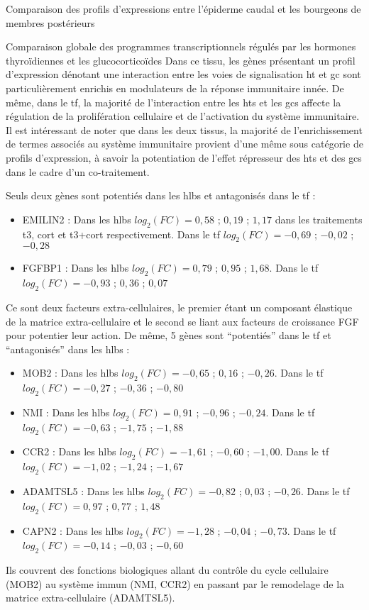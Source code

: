 \documentclass[../main.tex]{subfiles}
\begin{document}
\begin{chapter}{Comparaison des profils d'expressions entre l'épiderme caudal et les bourgeons de membres postérieurs}
\begin{section}{Comparaison globale des programmes transcriptionnels régulés par les hormones thyroïdiennes et les glucocorticoïdes}
Dans ce tissu, les gènes présentant un profil d'expression dénotant une interaction entre les voies de signalisation \gls{ht} et \gls{gc} sont particulièrement enrichis en modulateurs de la réponse immunitaire innée.
De même, dans le \gls{tf}, la majorité de l'interaction entre les \glspl{ht} et les \glspl{gc} affecte la régulation de la prolifération cellulaire et de l'activation du système immunitaire.
Il est intéressant de noter que dans les deux tissus, la majorité de l'enrichissement de termes associés au système immunitaire provient d'une même sous catégorie de profils d'expression, à savoir la potentiation de l'effet répresseur des \glspl{ht} et des \glspl{gc} dans le cadre d'un co-traitement.
\par
Seuls deux gènes sont potentiés dans les \glspl{hlb} et antagonisés dans le \gls{tf} :
\begin{itemize}
\item EMILIN2 : Dans les \glspl{hlb} $log_2(FC)=0,58$ ; $0,19$ ; $1,17$ dans les traitements \gls{t3}, \gls{cort} et \gls{t3}+\gls{cort} respectivement. Dans le \gls{tf} $log_2(FC)=-0,69$ ; $-0,02$ ; $-0,28$
\item FGFBP1 : Dans les \glspl{hlb} $log_2(FC)=0,79$ ; $0,95$ ; $1,68$. Dans le \gls{tf} $log_2(FC)=-0,93$ ; $0,36$ ; $0,07$
\end{itemize}
Ce sont deux facteurs extra-cellulaires, le premier étant un composant élastique de la matrice extra-cellulaire et le second se liant aux facteurs de croissance FGF pour potentier leur action.
De même, 5 gènes sont ``potentiés'' dans le \gls{tf} et ``antagonisés'' dans les \glspl{hlb} :
\begin{itemize}
\item MOB2 : Dans les \glspl{hlb} $log_2(FC)=-0,65$ ; $0,16$ ; $-0,26$. Dans le \gls{tf} $log_2(FC)=-0,27$ ; $-0,36$ ; $-0,80$
\item NMI : Dans les \glspl{hlb} $log_2(FC)=0,91$ ; $-0,96$ ; $-0,24$. Dans le \gls{tf} $log_2(FC)=-0,63$ ; $-1,75$ ; $-1,88$
\item CCR2 : Dans les \glspl{hlb} $log_2(FC)=-1,61$ ; $-0,60$ ; $-1,00$. Dans le \gls{tf} $log_2(FC)=-1,02$ ; $-1,24$ ; $-1,67$
\item ADAMTSL5 : Dans les \glspl{hlb} $log_2(FC)=-0,82$ ; $0,03$ ; $-0,26$. Dans le \gls{tf} $log_2(FC)=0,97$ ; $0,77$ ; $1,48$
\item CAPN2 : Dans les \glspl{hlb} $log_2(FC)=-1,28$ ; $-0,04$ ; $-0,73$. Dans le \gls{tf} $log_2(FC)=-0,14$ ; $-0,03$ ; $-0,60$
\end{itemize}
Ils couvrent des fonctions biologiques allant du contrôle du cycle cellulaire (MOB2) au système immun (NMI, CCR2) en passant par le remodelage de la matrice extra-cellulaire (ADAMTSL5).


\end{section}
\end{chapter}
\end{document}
